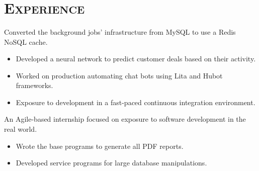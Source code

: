 \begin{resume}
\begin{formatb}
  \\
  \\
  \body\\
\end{formatb}

\section{\textsc{Experience}}
\begin{position}
  Converted the background jobs' infrastructure from MySQL to use a Redis NoSQL cache.
\begin{itemize}
\item Developed a neural network to predict customer deals based on their activity.
\end{itemize}
\begin{itemize}
\item Worked on production automating chat bots using Lita and Hubot frameworks.
\end{itemize}
\begin{itemize}
\item Exposure to development in a fast-paced continuous integration environment.
\end{itemize}
\end{position}

\begin{position}
  An Agile-based internship focused on exposure to software development in the real world. 
\begin{itemize}
\item Wrote the base programs to generate all PDF reports.
\end{itemize}
\begin{itemize}
\item Developed service programs for large database manipulations.
\end{itemize}
\end{position}

\begin{formatb}
  \\
  \body\\
\end{formatb}


\end{resume}
